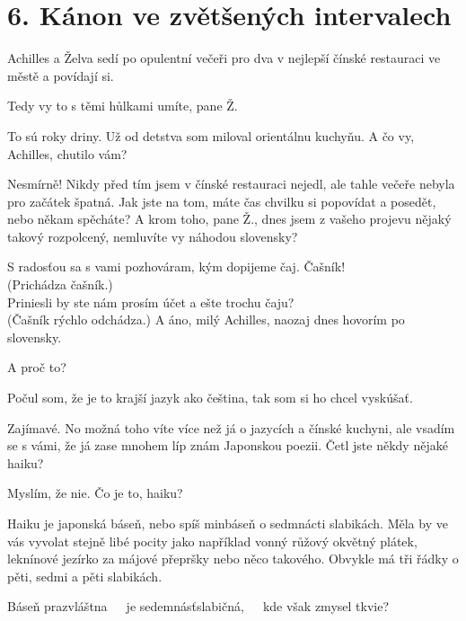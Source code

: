 \documentclass[12pt]{article}
\begin{document}
\section*{6. Kánon ve zvětšených intervalech}
Achilles a Želva sedí po opulentní večeři pro dva v nejlepší čínské restauraci 
    ve městě a povídají si.
\begin{description}[itemsep=0pt]
\item[A:] Tedy vy to s těmi hůlkami umíte, pane Ž.

\item[Ž:] To sú roky driny. Už od detstva som miloval orientálnu kuchyňu. 
    A čo vy, Achilles, chutilo vám?

\item[A:] Nesmírně! Nikdy před tím jsem v čínské restauraci nejedl, ale
    tahle večeře nebyla pro začátek špatná. Jak jste na tom, máte čas chvilku
    si popovídat a posedět, nebo někam spěcháte?
    A krom toho, pane Ž., dnes jsem z vašeho projevu nějaký takový
    rozpolcený, nemluvíte vy náhodou slovensky?

\item[Ž:] S radosťou sa s vami pozhováram, kým dopijeme čaj. Čašník!\\
    (Prichádza čašník.)\\
    Priniesli by ste nám prosím účet a ešte trochu čaju?\\
    (Čašník rýchlo odchádza.)
    A áno, milý Achilles, naozaj dnes hovorím po slovensky.
    
\item[A:] A proč to?

\item[Ž:] Počul som, že je to krajší jazyk ako čeština, tak som si ho chcel vyskúšať.

\item[A:] Zajímavé. No možná toho víte více než já o jazycích a čínské kuchyni, ale vsadím
    se s vámi, že já zase mnohem líp znám Japonskou poezii. Četl jste někdy
    nějaké haiku?

\item[Ž:] Myslím, že nie. Čo je to, haiku?

\item[A:] Haiku je japonská báseň, nebo spíš minbáseň o sedmnácti slabikách. 
    Měla by ve vás vyvolat stejně libé pocity jako například vonný růžový okvětný 
    plátek, leknínové jezírko za májové přepršky nebo něco takového. Obvykle má tři 
    řádky o pěti, sedmi a pěti slabikách.

\item[Ž:] Báseň prazvláštna\ \ \ je sedemnásťslabičná,\ \ \ kde však zmysel tkvie?


\end{description}
\end{document}

